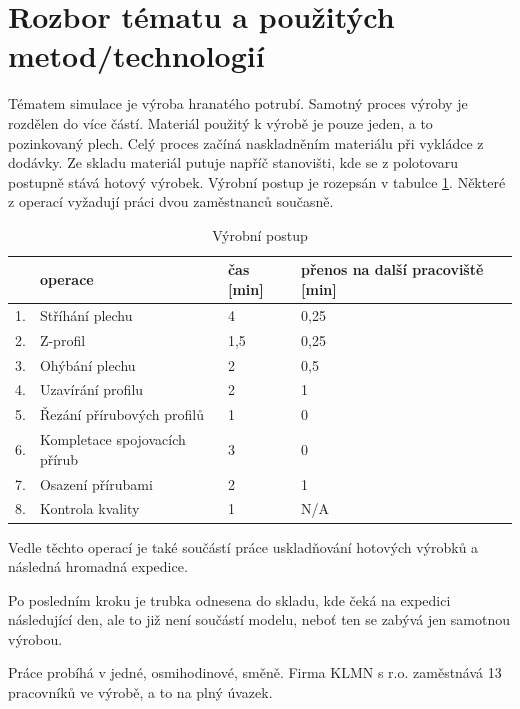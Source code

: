\documentclass[11pt, a4paper]{article}
\begin{document}
\section{Rozbor tématu a použitých metod/technologií}
Tématem simulace je výroba hranatého potrubí. Samotný proces výroby je rozdělen do více částí. Materiál použitý k výrobě je pouze jeden, a to pozinkovaný plech. %
Celý proces začíná naskladněním materiálu při vykládce z dodávky. Ze skladu materiál putuje napříč stanovišti, kde se z polotovaru postupně stává hotový výrobek. Výrobní postup je rozepsán v tabulce \ref{rgrg}. Některé z operací vyžadují práci dvou zaměstnanců současně.

\begin{table}[H]
    \centering
    \begin{tabular}{|l|l|l|l|}
     \hline  & \textbf{operace} &  \textbf{čas [min]} &  \textbf{přenos na další pracoviště [min]}\\ \hline
    1. &                Stříhání plechu   &  4 &  0,25\\ \hline
    2. &                Z-profil    &  1,5 &  0,25\\ \hline
    3. &                Ohýbání plechu    &  2  &  0,5\\ \hline
    4. &                Uzavírání profilu    & 2 &  1\\  \hline
    5. &                Řezání přírubových profilů    &  1 &  0\\ \hline
    6. &               Kompletace spojovacích přírub    &  3 &  0\\ \hline
    7. &                Osazení přírubami    &  2 &  1\\
    \hline
    8. &                Kontrola kvality    & 1  &  N/A\\
    \hline

    \end{tabular}
    \caption{Výrobní postup}
    \label{rgrg}
\end{table}

Vedle těchto operací je také součástí práce uskladňování hotových výrobků a následná hromadná expedice.

Po posledním kroku je trubka odnesena do skladu, kde čeká na expedici následující den, ale to již není součástí modelu, neboť ten se zabývá jen samotnou výrobou.

Práce probíhá v jedné, osmihodinové, směně. Firma KLMN s r.o. zaměstnává 13 pracovníků ve výrobě, a to na plný úvazek.
\end{document}
